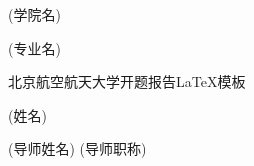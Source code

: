 
\school
{(学院名)}

\major
{(专业名)}

\thesistitle
{北京航空航天大学开题报告\LaTeX{}模板}

\thesisauthor
{(姓名)}

\teacher
{(导师姓名)}
\teacherdegree
{(导师职称)}





